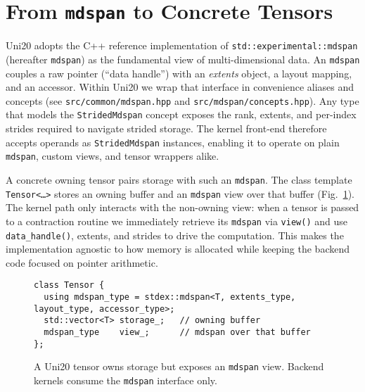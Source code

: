\documentclass[11pt]{article}
\begin{document}
\section{From \texttt{mdspan} to Concrete Tensors}
Uni20 adopts the C++ reference implementation of \texttt{std::experimental::mdspan} (hereafter
\texttt{mdspan}) as the fundamental view of multi-dimensional data.  An \texttt{mdspan} couples a
raw pointer (``data handle'') with an \emph{extents} object, a layout mapping, and an accessor.
Within Uni20 we wrap that interface in convenience aliases and concepts (see
\texttt{src/common/mdspan.hpp} and \texttt{src/mdspan/concepts.hpp}).  Any type that models the
\texttt{StridedMdspan} concept exposes the rank, extents, and per-index strides required to navigate
strided storage.  The kernel front-end therefore accepts operands as \texttt{StridedMdspan}
instances, enabling it to operate on plain \texttt{mdspan}, custom views, and tensor wrappers alike.

A concrete owning tensor pairs storage with such an \texttt{mdspan}.  The class template
\texttt{Tensor<\ldots>} stores an owning buffer and an \texttt{mdspan} view over that buffer
(Fig.~\ref{fig:tensor-mdspan}).  The kernel path only interacts with the non-owning view: when a
tensor is passed to a contraction routine we immediately retrieve its \texttt{mdspan} via
\texttt{view()} and use \texttt{data\_handle()}, extents, and strides to drive the computation.
This makes the implementation agnostic to how memory is allocated while keeping the backend code
focused on pointer arithmetic.

\begin{figure}[h]
  \centering
  \begin{minipage}{0.9\linewidth}
    \begin{lstlisting}
class Tensor {
  using mdspan_type = stdex::mdspan<T, extents_type, layout_type, accessor_type>;
  std::vector<T> storage_;   // owning buffer
  mdspan_type    view_;      // mdspan over that buffer
};
    \end{lstlisting}
  \end{minipage}
  \caption{A Uni20 tensor owns storage but exposes an \texttt{mdspan} view.  Backend kernels consume
  the \texttt{mdspan} interface only.}
  \label{fig:tensor-mdspan}
\end{figure}
\end{document}
